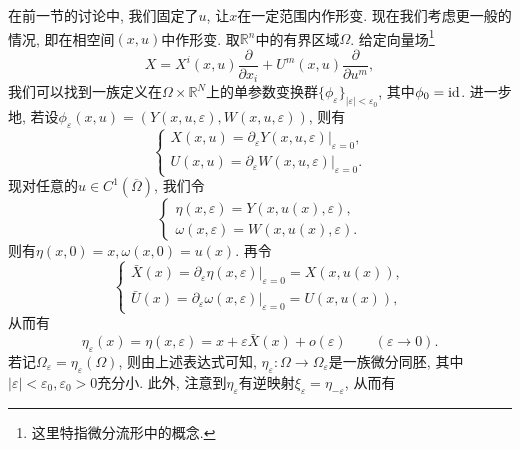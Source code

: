 \documentclass[12pt,a4paper]{article}
\begin{document}
在前一节的讨论中, 我们固定了$u$, 让$x$在一定范围内作形变. 现在我们考虑更一般的情况, 即在相空间$(x, u)$中作形变.
取$\mathbb{R}^n$中的有界区域$\Omega$. 给定向量场\footnote{这里特指微分流形中的概念.}
\begin{equation}\label{30}
    X = X^i(x, u)\frac{\partial}{\partial x_i} + U^m(x, u)\frac{\partial}{\partial u^m},
\end{equation}
我们可以找到一族定义在$\Omega \times \mathbb{R}^N$上的单参数变换群$\{\phi_{\varepsilon}\}_{|\varepsilon| < \varepsilon_0}$, 其中$\phi_0 = {\rm id}$.
进一步地, 若设$\phi_{\varepsilon}(x, u) = (Y(x, u, \varepsilon), W(x, u, \varepsilon))$, 则有 
\begin{equation*}
    \begin{cases} 
        X(x, u) = \partial_{\varepsilon}Y(x, u, \varepsilon)|_{\varepsilon = 0}, \\  
        U(x, u) = \partial_{\varepsilon}W(x, u, \varepsilon)|_{\varepsilon = 0}. 
    \end{cases}
\end{equation*}
现对任意的$u \in C^1(\overline{\Omega})$, 我们令
\begin{equation*}
    \begin{cases} 
        \eta(x, \varepsilon) = Y(x, u(x), \varepsilon), \\  
        \omega(x, \varepsilon) = W(x, u(x), \varepsilon). 
    \end{cases}
\end{equation*}
则有$\eta(x, 0) = x, \omega(x, 0) = u(x)$. 再令
\begin{equation}\label{31}
    \begin{cases} 
        \bar{X}(x) = \partial_{\varepsilon}\eta(x, \varepsilon)|_{\varepsilon = 0} = X(x, u(x)), \\  
        \bar{U}(x) = \partial_{\varepsilon}\omega(x, \varepsilon)|_{\varepsilon = 0} = U(x, u(x)), 
    \end{cases} 
\end{equation}
从而有 
\begin{equation*}
    \eta_{\varepsilon}(x) = \eta(x, \varepsilon) = x+ \varepsilon\bar{X}(x) + o(\varepsilon) \qquad (\varepsilon \rightarrow 0). 
\end{equation*}
若记$\Omega_{\varepsilon} = \eta_{\varepsilon}(\Omega)$, 则由上述表达式可知, $\eta_{\varepsilon}\colon \Omega \rightarrow \Omega_{\varepsilon}$是一族微分同胚, 其中$|\varepsilon| < \varepsilon_0, \varepsilon_0 > 0$充分小.
此外, 注意到$\eta_{\varepsilon}$有逆映射$\xi_{\varepsilon} = \eta_{-\varepsilon}$, 从而有
\end{document}
